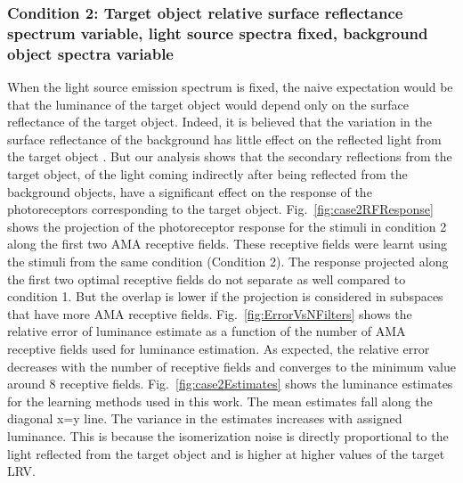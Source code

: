 \documentclass{jov}
\begin{document}
\subsubsection{Condition 2: Target object relative surface reflectance spectrum variable, light source spectra fixed, background object spectra variable}
When the light source emission spectrum is fixed, the naive expectation would be that the luminance of the target object would depend only on the surface reflectance of the target object. 
Indeed, it is believed that the variation in the surface reflectance of the background has little effect on the reflected light from the target object  \cite{BrainardWandellRetinex}. 
But our analysis shows that the secondary reflections from the target object, of the light coming indirectly after being reflected from the background objects, have a significant effect on the response of the photoreceptors corresponding to the target object. 
Fig.~{\ref{fig:case2RFResponse}} shows the projection of the photoreceptor response for the stimuli in condition 2 along the first two AMA receptive fields. 
These receptive fields were learnt using the stimuli from the same condition (Condition 2). 
The response projected along the first two optimal receptive fields do not separate as well compared to condition 1. 
But the overlap is lower if the projection is considered in subspaces that have more AMA receptive fields. 
Fig.~\ref{fig:ErrorVsNFilters} shows the relative error of luminance estimate as a function of the number of AMA receptive fields used for luminance estimation. 
As expected, the relative error decreases with the number of receptive fields and converges to the minimum value around 8 receptive fields. 
Fig.~\ref{fig:case2Estimates} shows the luminance estimates for the learning methods used in this work. 
The mean estimates fall along the diagonal x=y line. 
The variance in the estimates increases with assigned luminance. 
This is because the isomerization noise is directly proportional to the light reflected from the target object and is higher at higher values of the target LRV.
\end{document}
